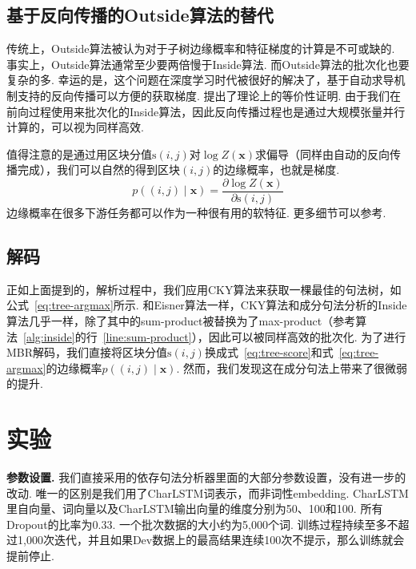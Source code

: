 \subsection{基于反向传播的Outside算法的替代}

传统上，Outside算法被认为对于子树边缘概率和特征梯度的计算是不可或缺的.
事实上，Outside算法通常至少要两倍慢于Inside算法.
而Outside算法的批次化也要复杂的多.
幸运的是，这个问题在深度学习时代被很好的解决了，基于自动求导机制支持的反向传播可以方便的获取梯度.
\citet{eisner-2016-inside}提出了理论上的等价性证明.
由于我们在前向过程使用来批次化的Inside算法，因此反向传播过程也是通过大规模张量并行计算的，可以视为同样高效.

值得注意的是通过用区块分值$\mathrm{s}(i,j)$对$\log Z(\boldsymbol{x})$求偏导（同样由自动的反向传播完成），我们可以自然的得到区块$(i,j)$的边缘概率，也就是梯度.
\begin{equation} \label{eq:con-partial-derivative}
  p((i, j)\mid\boldsymbol{x}) = \frac{\partial \log Z(\boldsymbol{x})}{\partial \mathrm{s}(i, j)}
\end{equation}
边缘概率在很多下游任务都可以作为一种很有用的软特征.
更多细节可以参考\citet{eisner-2016-inside}.

\subsection{解码}

正如上面提到的，解析过程中，我们应用CKY算法来获取一棵最佳的句法树，如公式~\ref{eq:tree-argmax}所示.
和Eisner算法一样，CKY算法和成分句法分析的Inside算法几乎一样，除了其中的sum-product被替换为了max-product（参考算法~\ref{alg:inside}的行~\ref{line:sum-product}），因此可以被同样高效的批次化.
为了进行MBR解码，我们直接将区块分值$\mathrm{s}(i,j)$换成式~\ref{eq:tree-score}和式~\ref{eq:tree-argmax}的边缘概率$p((i,j)\mid\boldsymbol{x})$.
然而，我们发现这在成分句法上带来了很微弱的提升.

\section{实验}
\label{sec:con-experiments}

\noindent\textbf{参数设置.}
我们直接采用\citet{dozat-etal-2017-biaffine}的依存句法分析器里面的大部分参数设置，没有进一步的改动.
唯一的区别是我们用了CharLSTM词表示，而非词性embedding.
CharLSTM里自向量、词向量以及CharLSTM输出向量的维度分别为50、100和100.
所有Dropout的比率为0.33.
一个批次数据的大小约为5,000个词.
训练过程持续至多不超过1,000次迭代，并且如果Dev数据上的最高结果连续100次不提示，那么训练就会提前停止.


